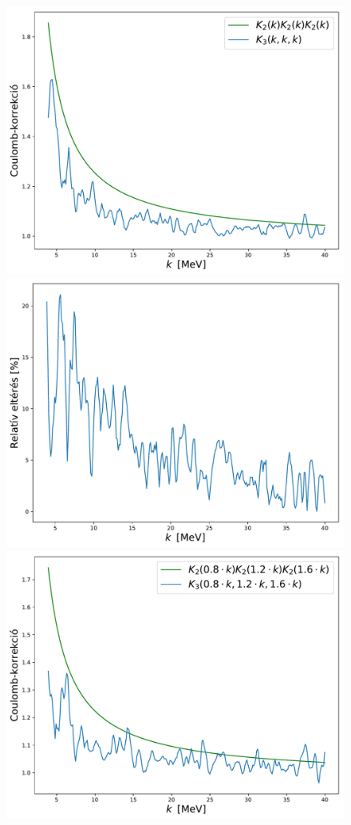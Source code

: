 \documentclass[11pt,a4paper]{article}
\numberwithin{equation}{subsection}
\numberwithin{figure}{section}
\begin{document}
\begin{figure}[H]
\centering
\includegraphics[scale=0.36]{pic/Coulomb/r3/K3-1_approx.pdf}
\includegraphics[scale=0.36]{pic/Coulomb/r3/K3-1_error.pdf}\\
\includegraphics[scale=0.36]{pic/Coulomb/r3/K3-2_approx.pdf}

\end{figure}
\end{document}
